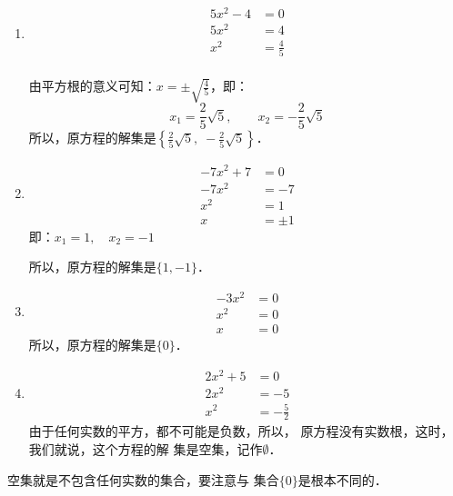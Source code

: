 \begin{solution}
\begin{enumerate}
    \item 
    \begin{align*}
        5x^2-4&=0\\
        5x^2&=4\tag{移项}\\
        x^2&=\frac{4}{5} \tag{两边除以5}\\
    \end{align*}

    由平方根的意义可知：$x=\pm\sqrt{\frac{4}{5}}$，即：
\[ x_1=\frac{2}{5}\sqrt{5},\qquad x_2=-\frac{2}{5}\sqrt{5} \]
所以，原方程的解集是$\left\{\frac{2}{5}\sqrt{5},\; -\frac{2}{5}\sqrt{5}\right\}$．

\item \begin{align*}
    -7x^2+7&=0\\
    -7x^2&=-7\tag{移项变号}\\
    x^2&=1\tag{两边除以$-7$}\\
    x&=\pm 1 \tag{平方根的意义}
\end{align*}
即：$x_1=1,\quad x_2=-1$

所以，原方程的解集是$\{1,-1\}$．

\item \begin{align*}
    -3x^2&=0\\
    x^2&=0 \tag{两边除以$-3$}\\
    x&=0
\end{align*}
所以，原方程的解集是$\{0\}$．

\item \begin{align*}
    2x^2+5&=0\\
2x^2&=-5  \tag{移项变号}\\
x^2&=-\frac{5}{2} \tag{两边除以2}
\end{align*}
由于任何实数的平方，都不可能是负数，所以，
原方程没有实数根，这时，我们就说，这个方程的解
集是空集，记作$\emptyset$．
\end{enumerate}
\end{solution}

\begin{rmk}
    空集就是不包含任何实数的集合，要注意与
集合$\{0\}$是根本不同的．
\end{rmk}

